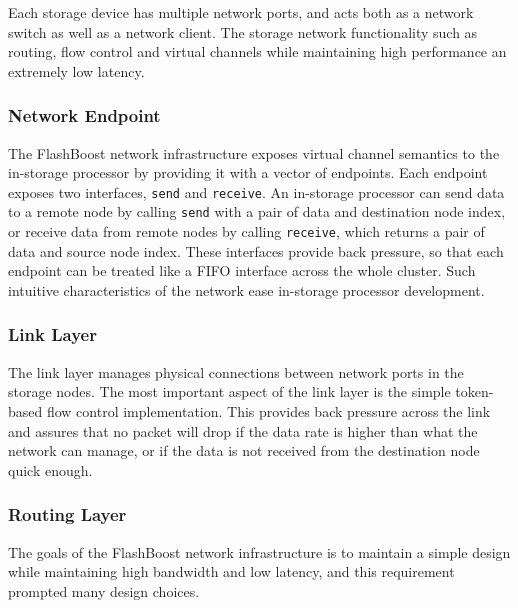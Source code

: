 Each storage device has multiple network ports, and
acts both as a network switch as well as a network client. The storage network
functionality such as routing, flow control and virtual channels while
maintaining high performance an extremely low latency.

\subsubsection{Network Endpoint}

The FlashBoost network infrastructure exposes virtual channel semantics to the
in-storage processor by providing it with a vector of endpoints. Each endpoint
exposes two interfaces, \texttt{send} and \texttt{receive}. An in-storage
processor can send data to a remote node by calling \texttt{send} with a pair of
data and destination node index, or receive data from remote nodes by calling
\texttt{receive}, which returns a pair of data and source node index. These
interfaces provide back pressure, so that each endpoint can be treated like a FIFO
interface across the whole cluster. Such intuitive characteristics of the
network ease in-storage processor development.

\subsubsection{Link Layer}

The link layer manages physical connections between network ports in the storage
nodes. The most important aspect of the link layer is the simple token-based
flow control implementation. This provides back pressure across the link and
assures that no packet will drop if the data rate is higher than what the
network can manage, or if the data is not received from the destination node
quick enough.

\subsubsection{Routing Layer}

The goals of the FlashBoost network infrastructure is to maintain a simple
design while maintaining high bandwidth and low latency, and this requirement
prompted many design choices.

